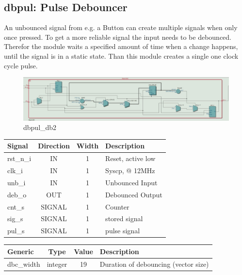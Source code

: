 \documentclass[12pt,a4 paper] {report}
\begin{document}
\subsection{dbpul: Pulse Debouncer}
An unbounced signal from e.g. a Button can create multiple signals when only once pressed. To get a more reliable signal 
the input needs to be debounced. Therefor the module waits a specified amount of time when a change happens, until the 
signal is in a static state. Than this module creates a single one clock cycle pulse.
\begin{figure}[h]
	\centering	
	\includegraphics[scale=0.3]{../png/dbpul_db2.png}
	\caption{dbpul\_db2}
\end{figure}
\begin{center}
	\begin{tabular}{ | p{2cm} | c | c | p{5cm} |}
		\hline
		\textbf{Signal} & \textbf{Direction} & \textbf{Width} & \textbf{Description} \\
		\hline
		\hline
  	rst\_n\_i & IN & 1 &  Reset, active low \\
  	\hline
		clk\_i & IN & 1 & Syscp, @ 12MHz \\
		\hline
		unb\_i & IN & 1 & Unbounced Input \\
		\hline
		deb\_o & OUT & 1 & Debounced Output \\
		\hline
		\hline	
		cnt\_s & SIGNAL & 1 & Counter \\
		\hline
		sig\_s & SIGNAL & 1 & stored signal \\ 
		\hline
		pul\_s & SIGNAL & 1 & pulse signal \\
		\hline
	\end{tabular}
\end{center}
\begin{center}
	\begin{tabular}{| p{2cm} | c | c | p{5cm} |}
	\hline
	\textbf{Generic} & \textbf{Type} & \textbf{Value} & \textbf{Description} \\
	\hline
	dbc\_width & integer & 19 & Duration of debouncing (vector size) \\
	\hline
	\end{tabular}
\end{center}
\end{document}
